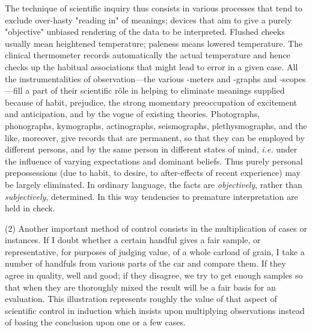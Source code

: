 \documentclass[showtrims,ustradepaper]{memoir}
\begin{document}
The technique of scientific inquiry thus consists in various processes
that tend to exclude over-hasty "reading in" of meanings; devices that
aim to give a purely "objective" unbiased rendering of the data to be
interpreted. Flushed cheeks usually mean heightened temperature;
paleness means lowered temperature. The clinical thermometer records
automatically the actual temperature and hence checks up the habitual
associations that might lead to error in a given case. All the
instrumentalities of observation---the various -meters and -graphs and
-scopes---fill a
part
of their scientific rôle in helping to eliminate meanings supplied
because of habit, prejudice, the strong momentary preoccupation of
excitement and anticipation, and by the vogue of existing theories.
Photographs, phonographs, kymographs, actinographs, seismographs,
plethysmographs, and the like, moreover, give records that are
permanent, so that they can be employed by different persons, and by the
same person in different states of mind, \emph{i.e.} under the influence
of varying expectations and dominant beliefs. Thus purely personal
prepossessions (due to habit, to desire, to after-effects of recent
experience) may be largely eliminated. In ordinary language, the facts
are \emph{objectively}, rather than \emph{subjectively}, determined. In
this way tendencies to premature interpretation are held in check.


(2) Another important method of control consists in the multiplication
of cases or instances. If I doubt whether a certain handful gives a fair
sample, or representative, for purposes of judging value, of a whole
carload of grain, I take a number of handfuls from various parts of the
car and compare them. If they agree in quality, well and good; if they
disagree, we try to get enough samples so that when they are thoroughly
mixed the result will be a fair basis for an evaluation. This
illustration represents roughly the value of that aspect of scientific
control in induction which insists upon multiplying observations instead
of basing the conclusion upon one or a few cases.

\end{document}
